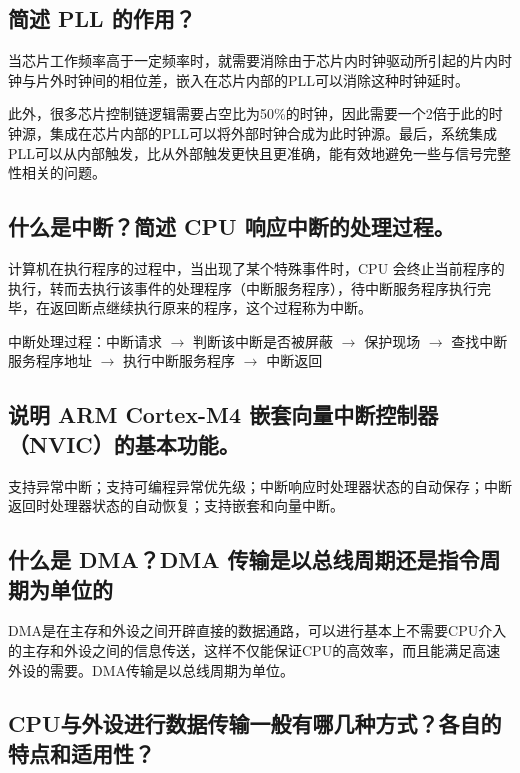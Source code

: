 \documentclass{article}
\begin{document}
\setcounter{subsection}{3}
\subsection{简述 PLL 的作用？}

当芯片工作频率高于一定频率时，就需要消除由于芯片内时钟驱动所引起的片内时钟与片外时钟间的相位差，嵌入在芯片内部的PLL可以消除这种时钟延时。

此外，很多芯片控制链逻辑需要占空比为50\%的时钟，因此需要一个2倍于此的时钟源，集成在芯片内部的PLL可以将外部时钟合成为此时钟源。最后，系统集成PLL可以从内部触发，比从外部触发更快且更准确，能有效地避免一些与信号完整性相关的问题。


\setcounter{subsection}{5}
\subsection{什么是中断？简述 CPU 响应中断的处理过程。}

计算机在执行程序的过程中，当出现了某个特殊事件时，CPU 会终止当前程序的执行，转而去执行该事件的处理程序（中断服务程序），待中断服务程序执行完毕，在返回断点继续执行原来的程序，这个过程称为中断。

中断处理过程：中断请求 $\rightarrow$ 判断该中断是否被屏蔽 $\rightarrow$ 保护现场 $\rightarrow$ 查找中断服务程序地址 $\rightarrow$ 执行中断服务程序 $\rightarrow$ 中断返回


\setcounter{subsection}{8}
\subsection{说明 ARM Cortex-M4 嵌套向量中断控制器（NVIC）的基本功能。}

支持异常中断；支持可编程异常优先级；中断响应时处理器状态的自动保存；中断返回时处理器状态的自动恢复；支持嵌套和向量中断。



\setcounter{subsection}{9}
\subsection{什么是 DMA？DMA 传输是以总线周期还是指令周期为单位的}

DMA是在主存和外设之间开辟直接的数据通路，可以进行基本上不需要CPU介入的主存和外设之间的信息传送，这样不仅能保证CPU的高效率，而且能满足高速外设的需要。DMA传输是以总线周期为单位。


\setcounter{subsection}{10}
\subsection{CPU与外设进行数据传输一般有哪几种方式？各自的特点和适用性？}
\end{document}
